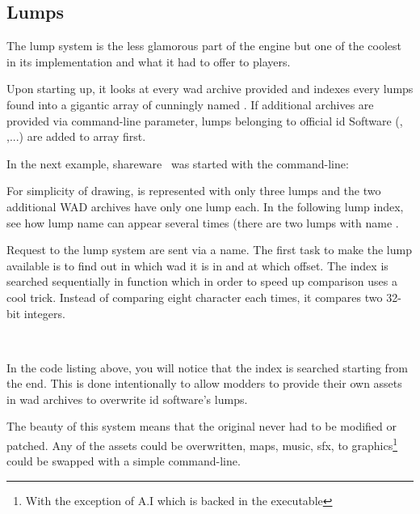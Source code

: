\subsection{Lumps} \label{wad_detailled}
The lump system is the less glamorous part of the engine but one of the coolest in its implementation and what it had to offer to players.\\
\par
Upon starting up, it looks at every wad archive provided and indexes every lumps found into a gigantic array of  cunningly named . 
If additional archives are provided via  command-line parameter, lumps belonging to official id Software (, ,...) are added to  array first.\\
\par
In the next example, shareware \doom~was started with the command-line:\\
\par
{}
\par
For simplicity of drawing,  is represented with only three lumps and the two additional WAD archives have only one lump each. In the following lump index, see how lump name can appear several times (there are two lumps with name .\\
\par
{}
\par
Request to the lump system are sent via a  name. The first task to make the lump available is to find out in which wad it is in and at which offset. The index is searched sequentially in function  which in order to speed up comparison uses a cool trick. Instead of comparing eight character each times, it compares two  32-bit integers.\\
\par
{}\\
\par
In the code listing above, you will notice that the index is searched starting from the end. This is done intentionally to allow modders to provide their own assets in wad archives to overwrite id software's lumps.\\
\par
The beauty of this system means that the original  never had to be modified or patched. Any of the assets could be overwritten, maps, music, sfx, to graphics\footnote{With the exception of A.I which is backed in the executable} could be swapped with a simple command-line.\\
